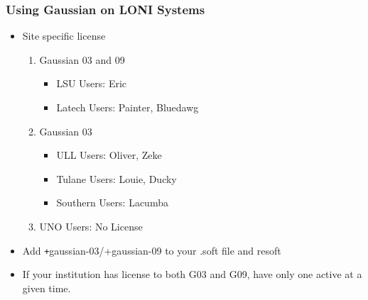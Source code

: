 \documentclass[slidestop,mathserif,compress,xcolor=svgnames]{beamer}
\begin{document}
\begin{frame}
\frametitle{\small Using Gaussian on LONI Systems}
\begin{itemize}
\item Site specific license%
\begin{enumerate}
 \item {\color{tigersblue}Gaussian 03 and 09}
\begin{itemize}
 \item {\color{tigersblue}LSU Users}: Eric
 \item {\color{tigersblue}Latech Users}: Painter, Bluedawg
\end{itemize}
 \item {\color{tigerspurple}Gaussian 03}
\begin{itemize}
 \item {\color{tigerspurple}ULL Users}: Oliver, Zeke
 \item {\color{tigerspurple}Tulane Users}: Louie, Ducky
 \item {\color{tigerspurple}Southern Users}: Lacumba
\end{itemize}
 \item UNO Users: No License
\end{enumerate}
\item Add {\texttt +gaussian-03/+gaussian-09} to your .soft file and resoft
\item \alert{If your institution has license to both G03 and G09, have only one active at a given time.}
\end{itemize}
\end{frame}
\end{document}
